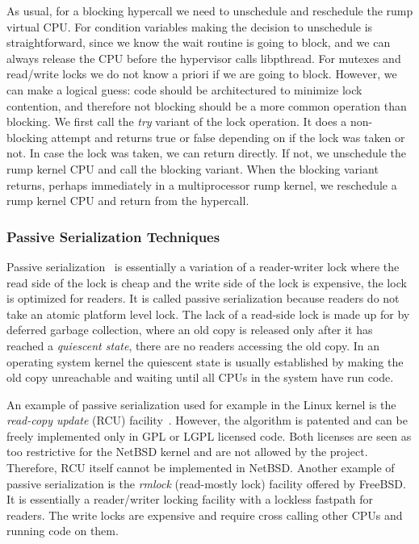 As usual, for a blocking hypercall we need to unschedule and
reschedule the rump virtual CPU.  For condition variables making the
decision to unschedule is
straightforward, since we know the wait routine is going to block,
and we can always release the CPU before the hypervisor calls libpthread.
For mutexes and read/write locks we do not know a priori if we are
going to block.  However, we can make a logical guess: code should
be architectured to minimize lock contention, and therefore not
blocking should be a more common operation than blocking.  We first
call the \textit{try} variant of the lock operation.  It does a
non-blocking attempt and returns true or false depending on if the
lock was taken or not.  In case the lock was taken, we can return
directly.  If not, we unschedule the rump kernel CPU and call the
blocking variant.  When the blocking variant returns, perhaps
immediately in a multiprocessor rump kernel, we reschedule a rump
kernel CPU and return from the hypercall.

\subsubsection{Passive Serialization Techniques}
\label{sect:passiveser}

Passive serialization~\cite{hennessy:passiveser} is essentially a
variation of a reader-writer lock where the read side of the lock is
cheap and the write side of the lock is expensive, \ie the lock is
optimized for readers.  It is called passive serialization because
readers do not take an atomic platform level lock.  The lack of a
read-side lock is made up
for by deferred garbage collection, where an old copy is released
only after it has reached a \textit{quiescent state}, \ie there are
no readers accessing the old copy.  In an operating system kernel
the quiescent state is usually established by making the old copy
unreachable and waiting until all CPUs in the system have run code.

An example of passive serialization used for example in the Linux
kernel is the \textit{read-copy update} (RCU)
facility~\cite{mckenney:phd}.  However, the algorithm is patented
and can be freely implemented only in GPL or LGPL licensed code.
Both licenses are seen as too restrictive for the NetBSD kernel and
are not allowed by the project.  Therefore, RCU itself cannot be
implemented in NetBSD.  Another example of passive serialization is
the \textit{rmlock} (read-mostly lock) facility offered by FreeBSD.
It is essentially a reader/writer locking facility with a lockless
fastpath for readers.  The write locks are expensive and
require cross calling other CPUs and running code on them.

